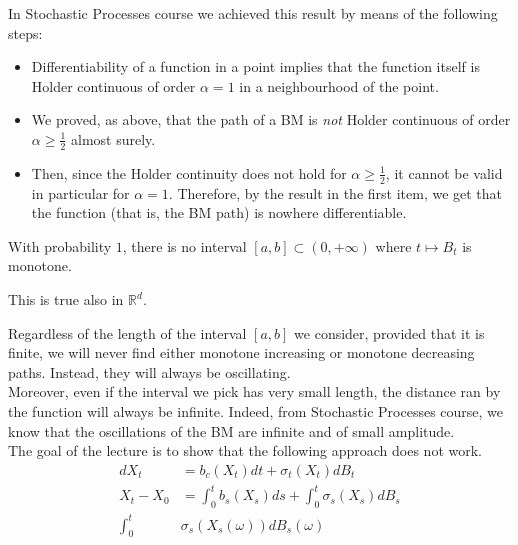 \begin{remark}
    In Stochastic Processes course we achieved this result by means of the following steps:
    \begin{itemize}
        \item Differentiability of a function in a point implies that the function itself is Holder continuous of order $\alpha = 1$ in a neighbourhood of the point.
        \item We proved, as above, that the path of a BM is \emph{not} Holder continuous of order $\alpha \geq \frac{1}{2}$ almost surely.
        \item Then, since the Holder continuity does not hold for $\alpha \geq \frac{1}{2}$, it cannot be valid in particular for $\alpha = 1$. Therefore, by the result in the first item, we get that the function (that is, the BM path) is nowhere differentiable. 
    \end{itemize}
\end{remark}
\begin{PropBox}
    \begin{Proposition}
    With probability $1$, there is no interval $[a,b] \subset (0,+\infty)$ where $t \mapsto B_t$ is monotone. 
\end{Proposition}
\end{PropBox}
\begin{remark}
    This is true also in $\mathbb{R}^d$. 
\end{remark}
Regardless of the length of the interval $[a,b]$ we consider, provided that it is finite, we will never find either monotone increasing or monotone decreasing paths. Instead, they will always be oscillating. \\
Moreover, even if the interval we pick has very small length, the distance ran by the
function will always be infinite. Indeed, from Stochastic Processes course, we know that the oscillations of the BM are infinite and of small amplitude. \\
The goal of the lecture is to show that the following approach does not work.
\begin{equation*}
\begin{split}
    d X_t &= b_c(X_t) dt + \sigma_t(X_t)dB_t\\
    X_t -X_0 &= \int_0^t b_s(X_s) ds + \int_0^t \sigma_s(X_s)dB_s\\
    \int_0^t &\sigma_s(X_s(\omega))dB_s(\omega)
\end{split}
\end{equation*}

